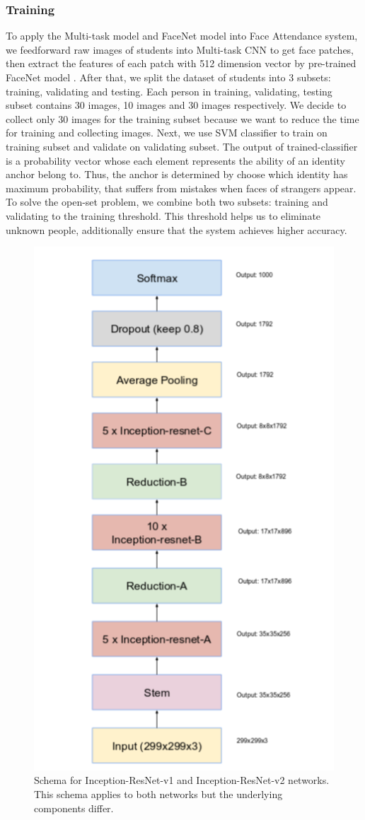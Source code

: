 \documentclass[journal, twocolumn]{IEEEtran}
\begin{document}
\subsubsection{Training} 
To apply the Multi-task model and FaceNet model into Face Attendance system, we feedforward raw images of students into Multi-task CNN to get face patches, then extract the features of each patch with 512 dimension vector by pre-trained FaceNet model \cite{ref:facenet}. After that, we split the dataset of students into 3 subsets: training, validating and testing. Each person in training, validating, testing subset contains 30 images, 10 images and 30 images respectively. We decide to collect only 30 images for the training subset because we want to reduce the time for training and collecting images. Next, we use SVM classifier to train on training subset and validate on validating subset. The output of trained-classifier is a probability vector whose each element represents the ability of an identity anchor belong to. Thus, the anchor is determined by choose which identity has maximum probability, that suffers from mistakes when faces of strangers appear. To solve the open-set problem, we combine both two subsets: training and validating to the training threshold. This threshold helps us to eliminate unknown people, additionally ensure that the system achieves higher accuracy.
\begin{figure}
    \centering
    \includegraphics[width=0.7\linewidth]{img/in_res_v1.png}
	\caption{Schema for Inception-ResNet-v1 and Inception-ResNet-v2 networks. This schema applies to both networks but the underlying components differ.}
	\label{fig:inception-resnet}
\end{figure}
\end{document}
